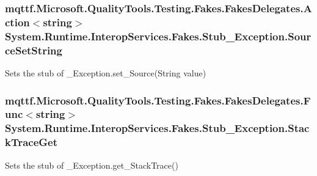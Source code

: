 \hypertarget{class_system_1_1_runtime_1_1_interop_services_1_1_fakes_1_1_stub___exception_a577971498f4722837d5629857de2add9}{
\subsubsection[{Source\-Set\-String}]{\setlength{\rightskip}{0pt plus 5cm}mqttf.\-Microsoft.\-Quality\-Tools.\-Testing.\-Fakes.\-Fakes\-Delegates.\-Action$<$string$>$ System.\-Runtime.\-Interop\-Services.\-Fakes.\-Stub\-\_\-\-Exception.\-Source\-Set\-String}}\label{class_system_1_1_runtime_1_1_interop_services_1_1_fakes_1_1_stub___exception_a577971498f4722837d5629857de2add9}


Sets the stub of \-\_\-\-Exception.\-set\-\_\-\-Source(\-String value)

\hypertarget{class_system_1_1_runtime_1_1_interop_services_1_1_fakes_1_1_stub___exception_ae36b660ff59e6111afd8f9f19c63b9fb}{
\subsubsection[{Stack\-Trace\-Get}]{\setlength{\rightskip}{0pt plus 5cm}mqttf.\-Microsoft.\-Quality\-Tools.\-Testing.\-Fakes.\-Fakes\-Delegates.\-Func$<$string$>$ System.\-Runtime.\-Interop\-Services.\-Fakes.\-Stub\-\_\-\-Exception.\-Stack\-Trace\-Get}}\label{class_system_1_1_runtime_1_1_interop_services_1_1_fakes_1_1_stub___exception_ae36b660ff59e6111afd8f9f19c63b9fb}


Sets the stub of \-\_\-\-Exception.\-get\-\_\-\-Stack\-Trace()

